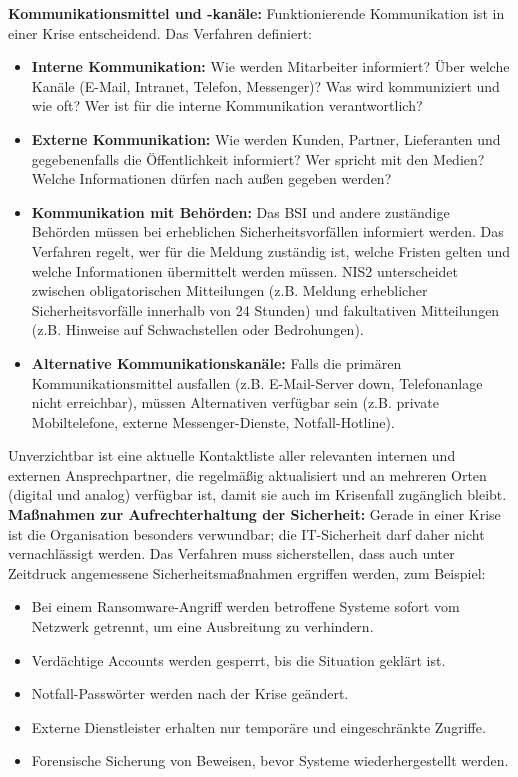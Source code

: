 \textbf{Kommunikationsmittel und -kanäle:} Funktionierende Kommunikation ist in einer Krise entscheidend. Das Verfahren definiert:
\begin{itemize}
    \item \textbf{Interne Kommunikation:} Wie werden Mitarbeiter informiert? Über welche Kanäle (E-Mail, Intranet, Telefon, Messenger)? Was wird kommuniziert und wie oft? Wer ist für die interne Kommunikation verantwortlich?
    \item \textbf{Externe Kommunikation:} Wie werden Kunden, Partner, Lieferanten und gegebenenfalls die Öffentlichkeit informiert? Wer spricht mit den Medien? Welche Informationen dürfen nach außen gegeben werden?
    \item \textbf{Kommunikation mit Behörden:} Das BSI und andere zuständige Behörden müssen bei erheblichen Sicherheitsvorfällen informiert werden. Das Verfahren regelt, wer für die Meldung zuständig ist, welche Fristen gelten und welche Informationen übermittelt werden müssen. NIS2 unterscheidet zwischen obligatorischen Mitteilungen (z.B. Meldung erheblicher Sicherheitsvorfälle innerhalb von 24 Stunden) und fakultativen Mitteilungen (z.B. Hinweise auf Schwachstellen oder Bedrohungen).
    \item \textbf{Alternative Kommunikationskanäle:} Falls die primären Kommunikationsmittel ausfallen (z.B. E-Mail-Server down, Telefonanlage nicht erreichbar), müssen Alternativen verfügbar sein (z.B. private Mobiltelefone, externe Messenger-Dienste, Notfall-Hotline).
\end{itemize}

Unverzichtbar ist eine aktuelle Kontaktliste aller relevanten internen und externen Ansprechpartner, die regelmäßig aktualisiert und an mehreren Orten (digital und analog) verfügbar ist, damit sie auch im Krisenfall zugänglich bleibt.
\newpage
\textbf{Maßnahmen zur Aufrechterhaltung der Sicherheit:} Gerade in einer Krise ist die Organisation besonders verwundbar; die IT-Sicherheit darf daher nicht vernachlässigt werden. Das Verfahren muss sicherstellen, dass auch unter Zeitdruck angemessene Sicherheitsmaßnahmen ergriffen werden, zum Beispiel:
\begin{itemize}
    \item Bei einem Ransomware-Angriff werden betroffene Systeme sofort vom Netzwerk getrennt, um eine Ausbreitung zu verhindern.
    \item Verdächtige Accounts werden gesperrt, bis die Situation geklärt ist.
    \item Notfall-Passwörter werden nach der Krise geändert.
    \item Externe Dienstleister erhalten nur temporäre und eingeschränkte Zugriffe.
    \item Forensische Sicherung von Beweisen, bevor Systeme wiederhergestellt werden.
\end{itemize}

